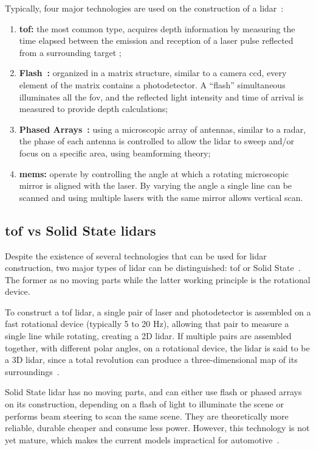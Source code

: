 Typically, four major technologies are used on the construction of a \ac{lidar}~\cite{Hecht2018, Sullg}:

\begin{enumerate}
	\item \textbf{\ac{tof}:} the most common type, acquires depth information by measuring the time elapsed between the emission and reception of a \ac{laser} pulse reflected from a surrounding target \cite{Sullivan2016};
	\item \textbf{Flash~\cite{Ouster, Gelbart2002,Stettner2010, Simpson2019}:} organized in a matrix structure, similar to a camera \ac{ccd}, every element of the matrix contains a photodetector. A ``flash'' simultaneous illuminates all the \ac{fov}, and the reflected light intensity and time of arrival is measured to provide depth calculations; 
	\item \textbf{Phased Arrays~\cite{Quanergy2018, Yu2016}:} using a microscopic array of antennas, similar to a \ac{radar}, the phase of each antenna is controlled to allow the \ac{lidar} to sweep and/or focus on a specific area, using beamforming theory;
	\item \textbf{\ac{mems}:} operate by controlling the angle at which a rotating microscopic mirror is aligned with the \ac{laser}. By varying the angle a single line can be scanned and using multiple \acp{laser} with the same mirror allows vertical scan.
\end{enumerate}


\subsection{\acl{tof} vs Solid State \acp{lidar}}
Despite the existence of several technologies that can be used for \ac{lidar} construction, two major types of \ac{lidar} can be distinguished: \ac{tof} or Solid State~\cite{Hecht2018}. The former as no moving parts while the latter working principle is the rotational device.

To construct a \ac{tof} \ac{lidar}, a single pair of \ac{laser} and photodetector is assembled on a fast rotational device (typically 5 to 20 Hz), allowing that pair to measure a single line while rotating, creating a 2D \ac{lidar}. If multiple pairs are assembled together, with different polar angles, on a rotational device, the \ac{lidar} is said to be a 3D \ac{lidar}, since a total revolution can produce a three-dimensional map of its surroundings~\cite{Sullivan2016}.

Solid State \ac{lidar} has no moving parts, and can either use flash or phased arrays on its construction, depending on a flash of light to illuminate the scene or performs beam steering to scan the same scene. They are theoretically more reliable, durable cheaper and consume less power. However, this technology is not yet mature, which makes the current models impractical for automotive~\cite{Fersch2017a}. 


